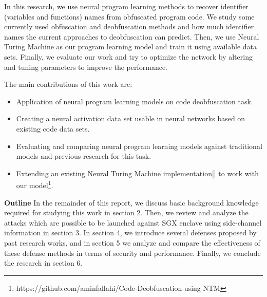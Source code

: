 \documentclass[acmsmall]{acmart}
\begin{document}
In this research, we use neural program learning methods to recover identifier (variables and functions) names from obfuscated program code. We study some currently used obfuscation and deobfuscation methods and how much identifier names the current approaches to deobfuscation can predict. Then, we use Neural Turing Machine as our program learning model and train it using available data sets. Finally, we evaluate our work and try to optimize the network by altering and tuning parameters to improve the performance.

The main contributions of this work are:
\begin{itemize}
	\item Application of neural program learning models on code deobfuscation task.
	\item Creating a neural activation data set usable in neural networks based on existing code data sets.
	\item Evaluating and comparing neural program learning models against traditional models and previous research for this task.
	\item Extending an existing Neural Turing Machine implementation[] to work with our model\footnote[1]{https://github.com/aminfallahi/Code-Deobfuscation-using-NTM}.
\end{itemize}

\textbf{Outline} In the remainder of this report, we discuss basic background knowledge required for studying this work in section 2. Then, we review and analyze the attacks which are possible to be launched against SGX enclave using side-channel information in section 3. In section 4, we introduce several defenses proposed by past research works, and in section 5 we analyze and compare the effectiveness of these defense methods in terms of security and performance. Finally, we conclude the research in section 6.
\end{document}
